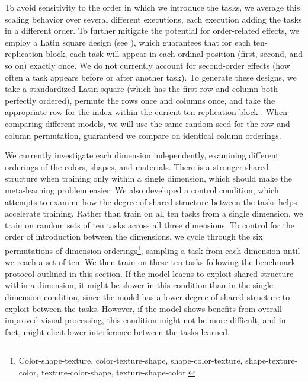 To avoid sensitivity to the order in which we introduce the tasks, we average this scaling behavior over several different executions, each execution adding the tasks in a different order. To further mitigate the potential for order-related effects, we employ a Latin square design (see \cite[][ch. 9]{Bailey2008}), which guarantees that for each ten-replication block, each task will appear in each ordinal position (first, second, and so on) exactly once. We do not currently account for second-order effects (how often a task appears before or after another task). To generate these designs, we take a standardized Latin square (which has the first row and column both perfectly ordered), permute the rows once and columns once, and take the appropriate row for the index within the current ten-replication block \parencite{InteractiveStatisticalPages}. When comparing different models, we will use the same random seed for the row and column permutation, guaranteed we compare on identical column orderings. 

We currently investigate each dimension independently, examining different orderings of the colors, shapes, and materials. There is a stronger shared structure when training only within a single dimension, which should make the meta-learning problem easier. We also developed a control condition, which attempts to examine how the degree of shared structure between the tasks helps accelerate training. Rather than train on all ten tasks from a single dimension, we train on random sets of ten tasks across all three dimensions. To control for the order of introduction between the dimensions, we cycle through the six permutations of dimension orderings\footnote{Color-shape-texture, color-texture-shape, shape-color-texture, shape-texture-color, texture-color-shape, texture-shape-color.}, sampling a task from each dimension until we reach a set of ten. We then train on these ten tasks following the benchmark protocol outlined in this section. If the model learns to exploit shared structure within a dimension, it might be slower in this condition than in the single-dimension condition, since the model has a lower degree of shared structure to exploit between the tasks. However, if the model shows benefits from overall improved visual processing, this condition might not be more difficult, and in fact, might elicit lower interference between the tasks learned.

